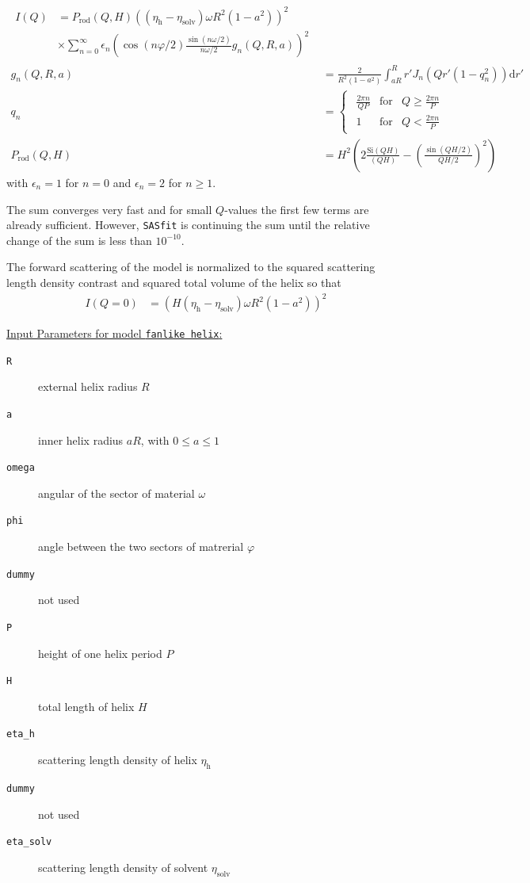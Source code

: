 \begin{align}
\begin{split}
I(Q) &= P_\text{rod}(Q,H) \left(\left(\eta_\text{h}-\eta_\text{solv}\right)\omega R^2\left(1-a^2\right)\right)^2 \\
&\times \sum_{n=0}^\infty \epsilon_n \left( \cos(n\varphi/2) \frac{\sin(n\omega/2)}{n\omega/2} g_n\left(Q,R,a\right)\right)^2
\end{split} \\
g_n\left(Q,R,a\right) &= \frac{2}{R^2\left(1-a^2\right)} \int_{aR}^R r' J_n\left(Qr'\left(1-q_n^2\right)\right)\mathrm{d}r' \\
q_n &=
\begin{cases}
\begin{array}{rcl}
\frac{2\pi n}{QP} & \text{for} & Q\geq \frac{2\pi n}{P}\\
1 & \text{for} & Q < \frac{2\pi n}{P}
\end{array}
\end{cases} \\
P_\text{rod}(Q,H) &= H^2 \left(2\frac{\mathrm{Si}(QH)}{(QH)}-\left(\frac{\sin(QH/2)}{QH/2}\right)^2\right)
\end{align}
with $\epsilon_n=1$ for $n=0$ and $\epsilon_n=2$ for $n\geq 1$.

The sum converges very fast and for small $Q$-values the first few terms are already sufficient. However, {\tt SASfit} is continuing the sum until the relative change of the sum is less than $10^{-10}$.

The forward scattering of the model is normalized to the squared scattering length density contrast and squared total volume of the helix so that
\begin{align}
I(Q=0) &= \left(H\left(\eta_\text{h}-\eta_\text{solv}\right)\omega R^2\left(1-a^2\right)\right)^2
\end{align}

\vspace{5mm}

\underline{Input Parameters for model \texttt{fanlike helix}:}\\
\begin{description}
\item[\texttt{R}] external helix radius $R$
\item[\texttt{a}] inner helix radius $aR$, with $0\leq a\leq 1$
\item[\texttt{omega}] angular of the sector of material $\omega$
\item[\texttt{phi}] angle between the two sectors of matrerial $\varphi$
\item[\texttt{dummy}] not used
\item[\texttt{P}] height of one helix period $P$
\item[\texttt{H}] total length of helix $H$
\item[\texttt{eta\_h}] scattering length density of helix $\eta_\text{h}$
\item[\texttt{dummy}] not used
\item[\texttt{eta\_solv}] scattering length density of solvent $\eta_\text{solv}$
\end{description}


